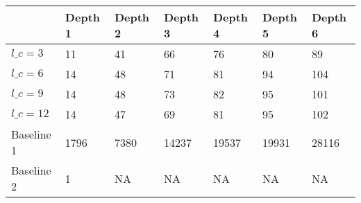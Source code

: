 \begin{tabular}{lllllll}
\toprule
{} & Depth 1 & Depth 2 & Depth 3 & Depth 4 & Depth 5 & Depth 6 \\
\midrule
$l\_c=3$    &      11 &      41 &      66 &      76 &      80 &      89 \\
$l\_c=6$    &      14 &      48 &      71 &      81 &      94 &     104 \\
$l\_c=9$    &      14 &      48 &      73 &      82 &      95 &     101 \\
$l\_c=12$   &      14 &      47 &      69 &      81 &      95 &     102 \\
Baseline 1 &    1796 &    7380 &   14237 &   19537 &   19931 &   28116 \\
Baseline 2 &       1 &      NA &      NA &      NA &      NA &      NA \\
\bottomrule
\end{tabular}
